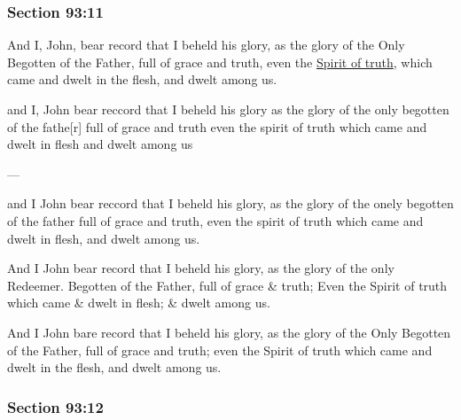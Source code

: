 	\subsubsection{Section 93:11} %
		\label{DC93-11}

		And I, John, bear record that I beheld his glory, as the glory of the Only Begotten of the Father, full of grace and truth, even the \hyperref[SPIRIT-PHRASES]{Spirit of truth}, which came and dwelt in the flesh, and dwelt among us.

		\begin{framed}
		\scriptsize
			\begin{compactdesc}
				\item[JSP] and I, John bear reccord that I beheld his glory as the glory of the only begotten of the fathe[r] full of grace and truth even the spirit of truth which came and dwelt in flesh and dwelt among us
				\item[BC] ---
				\item[RB2] and I John bear reccord that I beheld his glory, as the glory of the onely begotten of the father full of grace and truth, even the spirit of truth which came and dwelt in flesh, and dwelt among us. 
				\item[RB1] And I John bear record that I beheld his glory, as the glory of the only Redeemer. Begotten of the Father, full of grace \& truth; Even the Spirit of truth which came \& dwelt in flesh; \& dwelt among us. 
				\item[DC 1835] And I John bare record that I beheld his glory, as the glory of the Only Begotten of the Father, full of grace and truth; even the Spirit of truth which came and dwelt in the flesh, and dwelt among us.
			\end{compactdesc}
		\end{framed}

	\subsubsection{Section 93:12} %
		\label{DC93-12}

